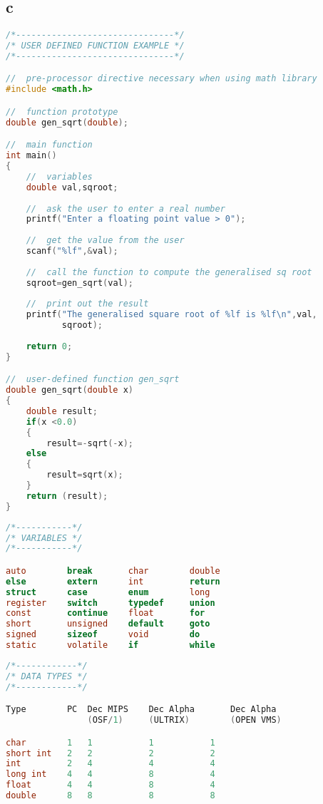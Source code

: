 \documentclass[8pt]{extarticle}
\begin{document}
\begin{small}
\begin{multicols}{2}
\section{c}




\begin{lstlisting}[language=C]
/*-------------------------------*/
/* USER DEFINED FUNCTION EXAMPLE */
/*-------------------------------*/

//  pre-processor directive necessary when using math library
#include <math.h>

//  function prototype
double gen_sqrt(double);

//  main function
int main()
{
	//  variables
    double val,sqroot;
    
    //  ask the user to enter a real number   
	printf("Enter a floating point value > 0");
	
    //  get the value from the user
	scanf("%lf",&val);
	
    //  call the function to compute the generalised sq root
    sqroot=gen_sqrt(val);
    
    //  print out the result
    printf("The generalised square root of %lf is %lf\n",val,
    	   sqroot);
    
    return 0;
}

//  user-defined function gen_sqrt
double gen_sqrt(double x)
{
	double result;
	if(x <0.0)
	{
        result=-sqrt(-x);
	else
	{
		result=sqrt(x);
	}
	return (result);
}
\end{lstlisting}

\begin{lstlisting}[language=C]
/*-----------*/
/* VARIABLES */
/*-----------*/

auto		break		char		double
else		extern		int			return
struct		case		enum		long
register	switch		typedef		union
const		continue	float		for
short		unsigned	default		goto
signed		sizeof		void		do
static		volatile	if			while
\end{lstlisting}

\begin{lstlisting}[language=C]
/*------------*/
/* DATA TYPES */
/*------------*/

Type		PC	Dec MIPS	Dec Alpha		Dec Alpha 
				(OSF/1)		(ULTRIX)		(OPEN VMS)

char		1	1			1			1
short int	2	2			2			2
int			2	4			4			4
long int	4	4			8			4
float		4	4			8			4
double		8	8			8			8
\end{lstlisting}


\end{multicols}
\end{small}
\end{document}
